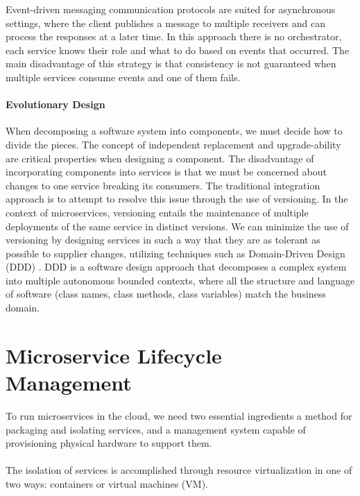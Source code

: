Event-driven messaging communication protocols are suited for asynchronous settings,
where the client publishes a message to multiple receivers and can process the responses at a later time.
In this approach there is no orchestrator, each service knows their role and what to do based on events that occurred.
The main disadvantage of this strategy is that consistency is not guaranteed when multiple services consume events and one of them fails.

\paragraph{Evolutionary Design}
When decomposing a software system into components, we must decide how to divide the pieces.
The concept of independent replacement and upgrade-ability are critical properties when designing a component.
The disadvantage of incorporating components into services is that we must be concerned about changes to one service breaking its consumers.
The traditional integration approach is to attempt to resolve this issue through the use of versioning.
In the context of microservices, versioning entails the maintenance of multiple deployments of the same service in distinct versions.
We can minimize the use of versioning by designing services in such a way that they are as tolerant as possible to supplier changes,
utilizing techniques such as Domain-Driven Design (DDD) \cite{ddd}.
DDD is a software design approach that decomposes a complex system into multiple autonomous bounded contexts,
where all the structure and language of software (class names, class methods, class variables) match the business domain.

\section{Microservice Lifecycle Management} %
\label{sec:microservice_lifecycle_management}

To run microservices in the cloud, we need two essential ingredients a method for packaging and isolating services,
and a management system capable of provisioning physical hardware to support them.

\paragraph{}

The isolation of services is accomplished through resource virtualization in one of two ways: containers or virtual machines (VM).

